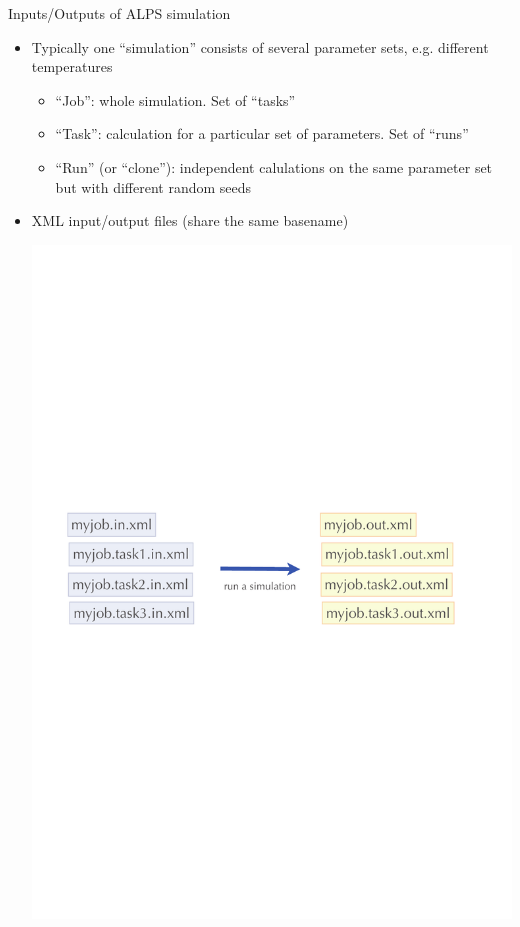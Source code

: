 \begin{frame}[t,fragile]{Inputs/Outputs of ALPS simulation}
  \begin{itemize}
  \item Typically one ``simulation'' consists of several parameter sets, e.g. different temperatures
    \begin{itemize}
    \item ``Job'': whole simulation.  Set of ``tasks''
    \item ``Task'': calculation for a particular set of parameters.  Set of ``runs''
    \item ``Run'' (or ``clone''): independent calulations on the same parameter set but with different random seeds
    \end{itemize}
  \item XML input/output files (share the same basename)
  \begin{center}
    \includegraphics[width=.55\textwidth]{simulation1.pdf}
  \end{center}
  \end{itemize}
\end{frame}

